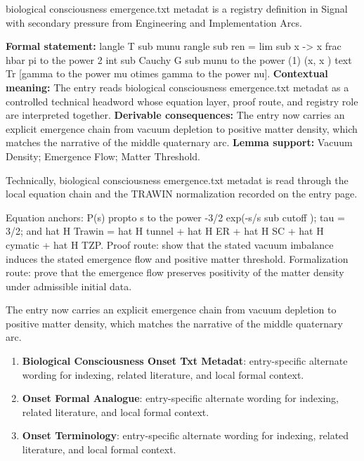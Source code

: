 
\begingroup\small
{}
biological consciousness emergence.txt metadat is a registry definition in Signal with secondary pressure from Engineering and Implementation Arcs.

\begingroup\footnotesize\setlength{\emergencystretch}{3em}\sloppy
\textbf{Formal statement:} langle T sub munu rangle sub ren = lim sub x -> x frac hbar pi to the power 2 int sub Cauchy G sub munu to the power (1) (x, x ) text Tr [gamma to the power mu otimes gamma to the power nu]. \textbf{Contextual meaning:} The entry reads biological consciousness emergence.txt metadat as a controlled technical headword whose equation layer, proof route, and registry role are interpreted together. \textbf{Derivable consequences:} The entry now carries an explicit emergence chain from vacuum depletion to positive matter density, which matches the narrative of the middle quaternary arc. \textbf{Lemma support:} Vacuum Density; Emergence Flow; Matter Threshold.\par
\endgroup

Technically, biological consciousness emergence.txt metadat is read through the local equation chain and the TRAWIN normalization recorded on the entry page.

Equation anchors: P(s) propto s to the power -3/2 exp(-s/s sub cutoff ); tau = 3/2; and hat H Trawin = hat H tunnel + hat H ER + hat H SC + hat H cymatic + hat H TZP. Proof route: show that the stated vacuum imbalance induces the stated emergence flow and positive matter threshold. Formalization route: prove that the emergence flow preserves positivity of the matter density under admissible initial data.

The entry now carries an explicit emergence chain from vacuum depletion to positive matter density, which matches the narrative of the middle quaternary arc.
\endgroup

\begin{enumerate}[leftmargin=1.6em,itemsep=6pt,topsep=4pt]
\item \textbf{Biological Consciousness Onset Txt Metadat}: entry-specific alternate wording for indexing, related literature, and local formal context.
\item \textbf{Onset Formal Analogue}: entry-specific alternate wording for indexing, related literature, and local formal context.
\item \textbf{Onset Terminology}: entry-specific alternate wording for indexing, related literature, and local formal context.
\end{enumerate}

